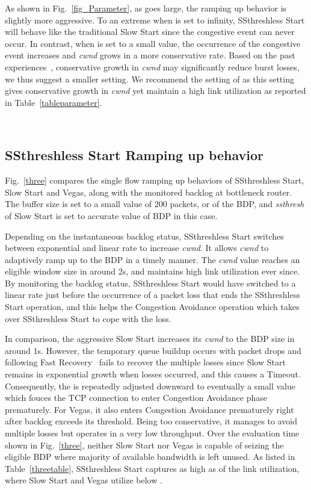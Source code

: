 \documentclass[12pt,onecolumn]{IEEEtran}
\begin{document}
As shown in Fig.~\ref{fig_Parameter}, as  goes large, the ramping up
behavior is slightly more aggressive. To an extreme when  is set to
infinity, SSthreshless Start will behave like the traditional Slow Start since
the congestive event can never occur. In contrast, when  is set to a
small value, the occurrence of the congestive event increases and \emph{cwnd}
grows in a more conservative rate. Based on the past
experiences~\cite{limited,smoothstart1}, conservative growth in \emph{cwnd} may
significantly reduce burst losses, we thus suggest a smaller  setting.
We recommend the setting of  as this setting gives conservative growth
in \emph{cwnd} yet maintain a high link utilization as reported in
Table~\ref{tableparameter}.

~\subsection{SSthreshless Start Ramping up behavior}

Fig.~\ref{three} compares the single flow ramping up behaviors of SSthreshless
Start, Slow Start and Vegas, along with the monitored backlog at bottleneck
router. The buffer size is set to a small value of 200 packets, or
 of the BDP, and \emph{ssthresh} of Slow Start is set to accurate
value of BDP in this case.

Depending on the instantaneous backlog status, SSthreshless Start switches
between exponential and linear rate to increase \emph{cwnd}. It allows
\emph{cwnd} to adaptively ramp up to the BDP in a timely manner. The
\emph{cwnd} value reaches an eligible window size in around 2s, and maintains
high link utilization ever since. By monitoring the backlog status, SSthreshless
Start would have switched to a linear rate just before the occurrence of a
packet loss that ends the SSthreshless Start operation, and this helps the
Congestion Avoidance operation which takes over SSthreshless Start to cope with
the loss.

In comparison, the aggressive Slow Start increases its \emph{cwnd} to the BDP
size in around 1s. However, the temporary queue buildup occurs with packet
drops and following Fast Recovery~\cite{newreno} fails to recover the multiple
losses since Slow Start remains in exponential growth when losses occurred, and
this causes a Timeout. Consequently, the  is repeatedly adjusted
downward to eventually a small value which fouces the TCP connection to enter Congestion Avoidance phase
prematurely. For Vegas, it also enters Congestion Avoidance prematurely right
after backlog exceeds its threshold. Being too conservative, it manages to
avoid multiple losses but operates in a very low throughput. Over the
evaluation time shown in Fig.~\ref{three}, neither Slow Start nor Vegas is
capable of seizing the eligible BDP where majority of available bandwidth is
left unused. As listed in Table~\ref{threetable}, SSthreshless Start captures
as high as  of the link utilization, where Slow Start and Vegas utilize
below .
\end{document}
